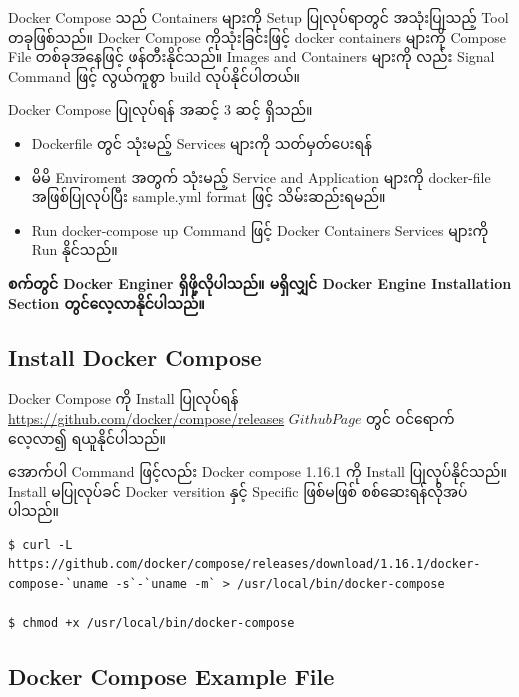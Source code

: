 \documentclass{article}
\begin{document}
Docker Compose သည် Containers များကို Setup ပြုလုပ်ရာတွင် အသုံးပြုသည့်
Tool တခုဖြစ်သည်။ Docker Compose ကိုသုံးခြင်းဖြင့် docker containers
များကို Compose File တစ်ခုအနေဖြင့် ဖန်တီးနိုင်သည်။ Images and Containers
များကို လည်း Signal Command ဖြင့် လွယ်ကူစွာ build လုပ်နိုင်ပါတယ်။

Docker Compose ပြုလုပ်ရန် အဆင့် $3$ ဆင့် ရှိသည်။

\begin{itemize}
\itemsep1pt\parskip0pt
\item
  Dockerfile တွင် သုံးမည့် Services များကို သတ်မှတ်ပေးရန်\\
\item
  မိမိ Enviroment အတွက် သုံးမည့် Service and Application များကို
  docker-file အဖြစ်ပြုလုပ်ပြီး sample.yml format ဖြင့် သိမ်းဆည်းရမည်။\\
\item
  Run docker-compose up Command ဖြင့် Docker Containers Services များကို
  Run နိုင်သည်။
\end{itemize}

\textbf{စက်တွင် Docker Enginer ရှိဖို့လိုပါသည်။ မရှိလျှင် Docker Engine
Installation Section တွင်လေ့လာနိုင်ပါသည်။}

\subsection{Install Docker Compose}\label{install-docker-compose}

Docker Compose ကို Install ပြုလုပ်ရန်
\href{https://github.com/docker/compose/releases}{\url{https://github.com/docker/compose/releases}}
$Github Page$ တွင် ဝင်ရောက်လေ့လာ၍ ရယူနိုင်ပါသည်။

အောက်ပါ Command ဖြင့်လည်း Docker compose 1.16.1 ကို Install
ပြုလုပ်နိုင်သည်။ Install မပြုလုပ်ခင် Docker versition နှင့် Specific
ဖြစ်မဖြစ် စစ်ဆေးရန်လိုအပ်ပါသည်။

\begin{verbatim}
$ curl -L https://github.com/docker/compose/releases/download/1.16.1/docker-compose-`uname -s`-`uname -m` > /usr/local/bin/docker-compose

$ chmod +x /usr/local/bin/docker-compose
\end{verbatim}

\subsection{Docker Compose Example
File}\label{docker-compose-example-file}
\end{document}
